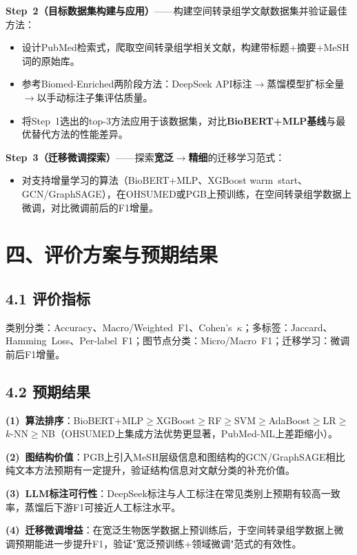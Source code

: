 \documentclass[12pt,a4paper]{ctexart}
\begin{document}
\textbf{Step~2（目标数据集构建与应用）}——构建空间转录组学文献数据集并验证最佳方法：
\begin{itemize}
  \setlength{\itemsep}{-2pt}\setlength{\parsep}{0pt}
  \item 设计PubMed检索式，爬取空间转录组学相关文献，构建带标题+摘要+MeSH词的原始库。
  \item 参考Biomed-Enriched两阶段方法：DeepSeek API标注$\to$蒸馏模型扩标全量$\to$以手动标注子集评估质量。
  \item 将Step~1选出的top-3方法应用于该数据集，对比\textbf{BioBERT+MLP基线}与最优替代方法的性能差异。
\end{itemize}

\textbf{Step~3（迁移微调探索）}——探索\textbf{宽泛$\to$精细}的迁移学习范式：
\begin{itemize}
  \setlength{\itemsep}{-2pt}\setlength{\parsep}{0pt}
  \item 对支持增量学习的算法（BioBERT+MLP、XGBoost warm~start、GCN/GraphSAGE），在OHSUMED或PGB上预训练，在空间转录组学数据上微调，对比微调前后的F1增量。
\end{itemize}

\section{四、评价方案与预期结果}

\subsection*{4.1 评价指标}

类别分类：Accuracy、Macro/Weighted~F1、Cohen's~$\kappa$；多标签：Jaccard、Hamming~Loss、Per-label~F1；图节点分类：Micro/Macro~F1；迁移学习：微调前后F1增量。

\subsection*{4.2 预期结果}

\textbf{(1)~算法排序}：BioBERT+MLP$\ge$XGBoost$\ge$RF$\ge$SVM$\ge$AdaBoost$\ge$LR$\ge$$k$-NN$\ge$NB（OHSUMED上集成方法优势更显著，PubMed-ML上差距缩小）。

\textbf{(2)~图结构价值}：PGB上引入MeSH层级信息和图结构的GCN/GraphSAGE相比纯文本方法预期有一定提升，验证结构信息对文献分类的补充价值。

\textbf{(3)~LLM标注可行性}：DeepSeek标注与人工标注在常见类别上预期有较高一致率，蒸馏后下游F1可接近人工标注水平。

\textbf{(4)~迁移微调增益}：在宽泛生物医学数据上预训练后，于空间转录组学数据上微调预期能进一步提升F1，验证"宽泛预训练+领域微调"范式的有效性。
\end{document}
